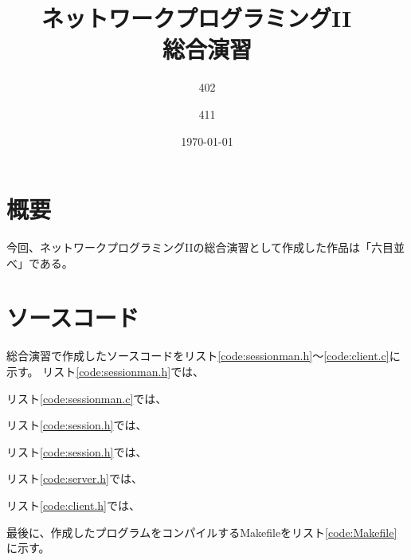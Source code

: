 \documentclass[a4j, titlepage, 10pt]{jsarticle}
\begin{document}
\title{{ \Huge ネットワークプログラミングII }~\\{ \LARGE 総合演習 }}
\author{{ \Large 402 } \and { \Large 411 }}
\date{\today}
\maketitle

\section{概要}

今回、ネットワークプログラミングIIの総合演習として作成した作品は「六目並べ」である。

\section{ソースコード}

総合演習で作成したソースコードをリスト\ref{code:sessionman.h}～\ref{code:client.c}に示す。
リスト\ref{code:sessionman.h}では、

\lstset{ numbers = left }


リスト\ref{code:sessionman.c}では、

\lstset{ numbers = left }


リスト\ref{code:session.h}では、

\lstset{ numbers = left }


リスト\ref{code:session.h}では、

\lstset{ numbers = left }


リスト\ref{code:server.h}では、

\lstset{ numbers = left }


リスト\ref{code:client.h}では、

\lstset{ numbers = left }


最後に、作成したプログラムをコンパイルするMakefileをリスト\ref{code:Makefile}に示す。
\end{document}
